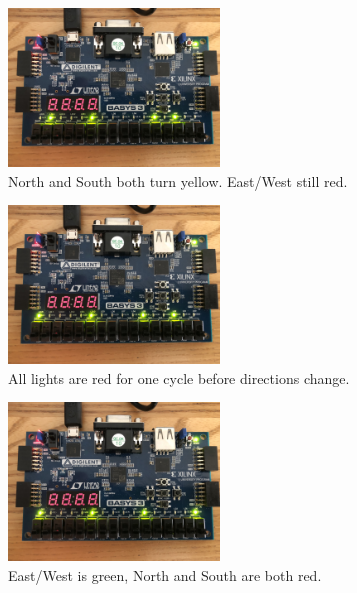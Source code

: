 \documentclass[11pt]{article}
\begin{document}
\begin{figure}[H]
\begin{center}
	\includegraphics[width=0.5\textwidth]{./images/Part1/l9p1img2.jpg}
	\caption{\label{fig:part1_img2}North and South both turn yellow. East/West still red.}
\end{center}
\end{figure}

\begin{figure}[H]
\begin{center}
	\includegraphics[width=0.5\textwidth]{./images/Part1/l9p1img3.jpg}
	\caption{\label{fig:part1_img3}All lights are red for one cycle before directions change.}
\end{center}
\end{figure}

\begin{figure}[H]
\begin{center}
	\includegraphics[width=0.5\textwidth]{./images/Part1/l9p1img4.jpg}
	\caption{\label{fig:part1_img4}East/West is green, North and South are both red.}
\end{center}
\end{figure}
\end{document}
